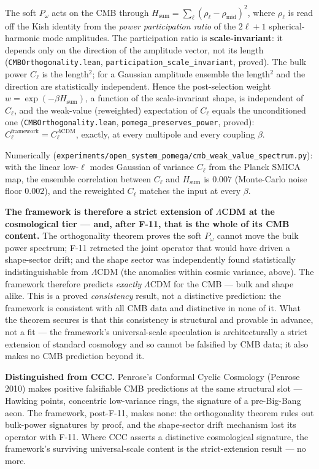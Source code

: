 \documentclass[11pt,a4paper]{article}
\newcommand{\Pomega}{P_{\omega}}
\begin{document}
The soft $\Pomega$ acts on the CMB through $H_{\text{sum}} = \sum_\ell (\rho_\ell - \rho_{\text{mid}})^2$, where $\rho_\ell$ is read off the Kish identity from the \emph{power participation ratio} of the $2\ell+1$ spherical-harmonic mode amplitudes. The participation ratio is \textbf{scale-invariant}: it depends only on the direction of the amplitude vector, not its length (\texttt{CMBOrthogonality.lean}, \texttt{participation\_scale\_invariant}, proved). The bulk power $C_\ell$ is the length$^2$; for a Gaussian amplitude ensemble the length$^2$ and the direction are statistically independent. Hence the post-selection weight $w = \exp(-\beta H_{\text{sum}})$, a function of the scale-invariant shape, is independent of $C_\ell$, and the weak-value (reweighted) expectation of $C_\ell$ equals the unconditioned one (\texttt{CMBOrthogonality.lean}, \texttt{pomega\_preserves\_power}, proved): $C_\ell^{\text{framework}} = C_\ell^{\Lambda\text{CDM}}$, exactly, at every multipole and every coupling $\beta$.

Numerically (\texttt{experiments/open\_system\_pomega/cmb\_weak\_value\_spectrum.py}): with the linear low-$\ell$ modes Gaussian of variance $C_\ell$ from the Planck SMICA map, the ensemble correlation between $C_\ell$ and $H_{\text{sum}}$ is $0.007$ (Monte-Carlo noise floor $0.002$), and the reweighted $C_\ell$ matches the input at every $\beta$.

\textbf{The framework is therefore a strict extension of $\Lambda$CDM at the cosmological tier --- and, after F-11, that is the whole of its CMB content.} The orthogonality theorem proves the soft $\Pomega$ cannot move the bulk power spectrum; F-11 retracted the joint operator that would have driven a shape-sector drift; and the shape sector was independently found statistically indistinguishable from $\Lambda$CDM (the anomalies within cosmic variance, above). The framework therefore predicts \emph{exactly} $\Lambda$CDM for the CMB --- bulk and shape alike. This is a proved \emph{consistency} result, not a distinctive prediction: the framework is consistent with all CMB data and distinctive in none of it. What the theorem secures is that this consistency is structural and provable in advance, not a fit --- the framework's universal-scale speculation is architecturally a strict extension of standard cosmology and so cannot be falsified by CMB data; it also makes no CMB prediction beyond it.

\textbf{Distinguished from CCC.} Penrose's Conformal Cyclic Cosmology (Penrose 2010) makes positive falsifiable CMB predictions at the same structural slot --- Hawking points, concentric low-variance rings, the signature of a pre-Big-Bang aeon. The framework, post-F-11, makes none: the orthogonality theorem rules out bulk-power signatures by proof, and the shape-sector drift mechanism lost its operator with F-11. Where CCC asserts a distinctive cosmological signature, the framework's surviving universal-scale content is the strict-extension result --- no more.
\end{document}

